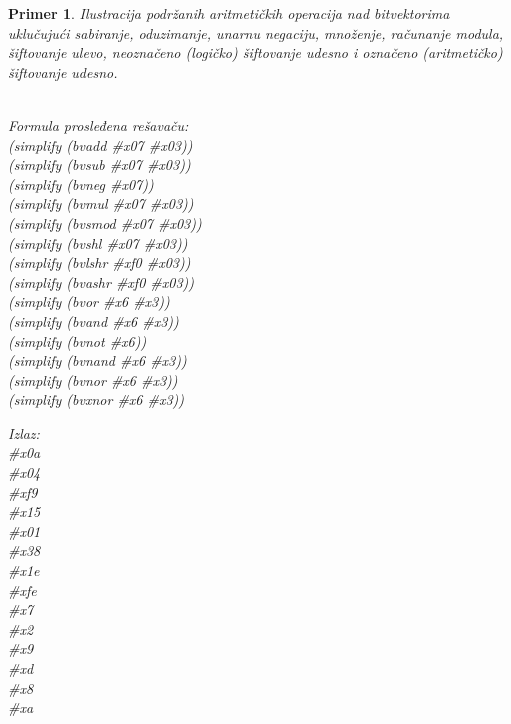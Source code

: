 \documentclass[12pt,oneside]{memoir}
\newtheorem{primer}{Primer}
\begin{document}
\begin{primer} Ilustracija podržanih aritmetičkih operacija nad bitvektorima uklučujući sabiranje, oduzimanje, unarnu negaciju, množenje, računanje modula, šiftovanje ulevo, neoznačeno (logičko) šiftovanje udesno i označeno (aritmetičko) šiftovanje udesno.
\\\\
\begin{minipage}[b]{0.5\textwidth}
Formula prosleđena rešavaču:
\\(simplify (bvadd \#x07 \#x03)) 
\\(simplify (bvsub \#x07 \#x03))
\\(simplify (bvneg \#x07)) 
\\(simplify (bvmul \#x07 \#x03)) 
\\(simplify (bvsmod \#x07 \#x03)) 
\\(simplify (bvshl \#x07 \#x03)) 
\\(simplify (bvlshr \#xf0 \#x03)) 
\\(simplify (bvashr \#xf0 \#x03)) 
\\(simplify (bvor \#x6 \#x3)) 
\\(simplify (bvand \#x6 \#x3))  
\\(simplify (bvnot \#x6)) 
\\(simplify (bvnand \#x6 \#x3)) 
\\(simplify (bvnor \#x6 \#x3)) 
\\(simplify (bvxnor \#x6 \#x3)) 

\end{minipage}
\hspace{2.5cm}
\begin{minipage}[b]{0.5\textwidth}
Izlaz:
\\\#x0a 
\\\#x04 
\\\#xf9 
\\\#x15 
\\\#x01 
\\\#x38 
\\\#x1e 
\\\#xfe
\\\#x7 
\\\#x2 
\\\#x9 
\\\#xd 
\\\#x8 
\\\#xa
\end{minipage}

\end{primer}
\end{document}
